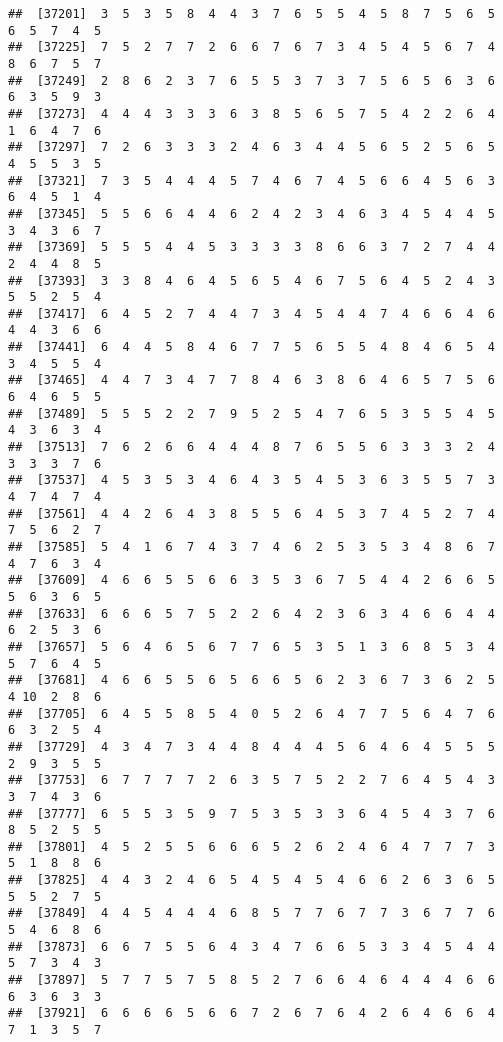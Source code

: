 \documentclass[
]{book}
\begin{document}
\begin{verbatim}
##  [37201]  3  5  3  5  8  4  4  3  7  6  5  5  4  5  8  7  5  6  5  6  5  7  4  5
##  [37225]  7  5  2  7  7  2  6  6  7  6  7  3  4  5  4  5  6  7  4  8  6  7  5  7
##  [37249]  2  8  6  2  3  7  6  5  5  3  7  3  7  5  6  5  6  3  6  6  3  5  9  3
##  [37273]  4  4  4  3  3  3  6  3  8  5  6  5  7  5  4  2  2  6  4  1  6  4  7  6
##  [37297]  7  2  6  3  3  3  2  4  6  3  4  4  5  6  5  2  5  6  5  4  5  5  3  5
##  [37321]  7  3  5  4  4  4  5  7  4  6  7  4  5  6  6  4  5  6  3  6  4  5  1  4
##  [37345]  5  5  6  6  4  4  6  2  4  2  3  4  6  3  4  5  4  4  5  3  4  3  6  7
##  [37369]  5  5  5  4  4  5  3  3  3  3  8  6  6  3  7  2  7  4  4  2  4  4  8  5
##  [37393]  3  3  8  4  6  4  5  6  5  4  6  7  5  6  4  5  2  4  3  5  5  2  5  4
##  [37417]  6  4  5  2  7  4  4  7  3  4  5  4  4  7  4  6  6  4  6  4  4  3  6  6
##  [37441]  6  4  4  5  8  4  6  7  7  5  6  5  5  4  8  4  6  5  4  3  4  5  5  4
##  [37465]  4  4  7  3  4  7  7  8  4  6  3  8  6  4  6  5  7  5  6  6  4  6  5  5
##  [37489]  5  5  5  2  2  7  9  5  2  5  4  7  6  5  3  5  5  4  5  4  3  6  3  4
##  [37513]  7  6  2  6  6  4  4  4  8  7  6  5  5  6  3  3  3  2  4  3  3  3  7  6
##  [37537]  4  5  3  5  3  4  6  4  3  5  4  5  3  6  3  5  5  7  3  4  7  4  7  4
##  [37561]  4  4  2  6  4  3  8  5  5  6  4  5  3  7  4  5  2  7  4  7  5  6  2  7
##  [37585]  5  4  1  6  7  4  3  7  4  6  2  5  3  5  3  4  8  6  7  4  7  6  3  4
##  [37609]  4  6  6  5  5  6  6  3  5  3  6  7  5  4  4  2  6  6  5  5  6  3  6  5
##  [37633]  6  6  6  5  7  5  2  2  6  4  2  3  6  3  4  6  6  4  4  6  2  5  3  6
##  [37657]  5  6  4  6  5  6  7  7  6  5  3  5  1  3  6  8  5  3  4  5  7  6  4  5
##  [37681]  4  6  6  5  5  6  5  6  6  5  6  2  3  6  7  3  6  2  5  4 10  2  8  6
##  [37705]  6  4  5  5  8  5  4  0  5  2  6  4  7  7  5  6  4  7  6  6  3  2  5  4
##  [37729]  4  3  4  7  3  4  4  8  4  4  4  5  6  4  6  4  5  5  5  2  9  3  5  5
##  [37753]  6  7  7  7  7  2  6  3  5  7  5  2  2  7  6  4  5  4  3  3  7  4  3  6
##  [37777]  6  5  5  3  5  9  7  5  3  5  3  3  6  4  5  4  3  7  6  8  5  2  5  5
##  [37801]  4  5  2  5  5  6  6  6  5  2  6  2  4  6  4  7  7  7  3  5  1  8  8  6
##  [37825]  4  4  3  2  4  6  5  4  5  4  5  4  6  6  2  6  3  6  5  5  5  2  7  5
##  [37849]  4  4  5  4  4  4  6  8  5  7  7  6  7  7  3  6  7  7  6  5  4  6  8  6
##  [37873]  6  6  7  5  5  6  4  3  4  7  6  6  5  3  3  4  5  4  4  5  7  3  4  3
##  [37897]  5  7  7  5  7  5  8  5  2  7  6  6  4  6  4  4  4  6  6  6  3  6  3  3
##  [37921]  6  6  6  6  5  6  6  7  2  6  7  6  4  2  6  4  6  6  4  7  1  3  5  7

\end{verbatim}
\end{document}
